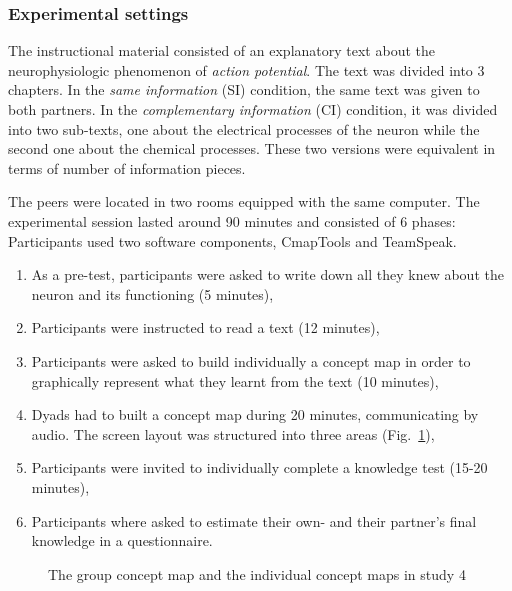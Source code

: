 \documentclass[natbib]{svjour3}
\begin{document}
\subsubsection*{Experimental settings}

The instructional material consisted of an explanatory text about the
neurophysiologic phenomenon of \emph{action potential}. The text was divided
into 3 chapters.  In the \emph{same information} (SI) condition, the same text
was given to both partners. In the \emph{complementary information} (CI)
condition, it was divided into two sub-texts, one about the electrical processes
of the neuron while the second one about the chemical processes. These two
versions were equivalent in terms of number of information pieces. 

The peers were located in two rooms equipped with the same
computer.  The experimental session lasted around 90 minutes and consisted of 6
phases: Participants used two software components, {\sc CmapTools} and {\sc
TeamSpeak}.

\begin{enumerate}

    \item As a pre-test, participants were asked to write down all they knew
        about the neuron and its functioning (5 minutes),

    \item Participants were instructed to read a text (12 minutes),

    \item Participants were asked to build individually a concept map in order to
        graphically represent what they learnt from the text (10 minutes),

    \item Dyads had to built a concept map during 20 minutes, communicating by
        audio.  The screen layout was structured into three areas
        (Fig.~\ref{study4:concept_map}),

    \item Participants were invited to individually complete a knowledge test
        (15-20 minutes),

    \item Participants where asked to estimate their own- and their partner's
        final knowledge in a questionnaire. 

\end{enumerate}



\begin{figure}
    \centering
    \caption{The group concept map and the individual concept maps in study
    4}
    \label{study4:concept_map}
\end{figure}
\end{document}
